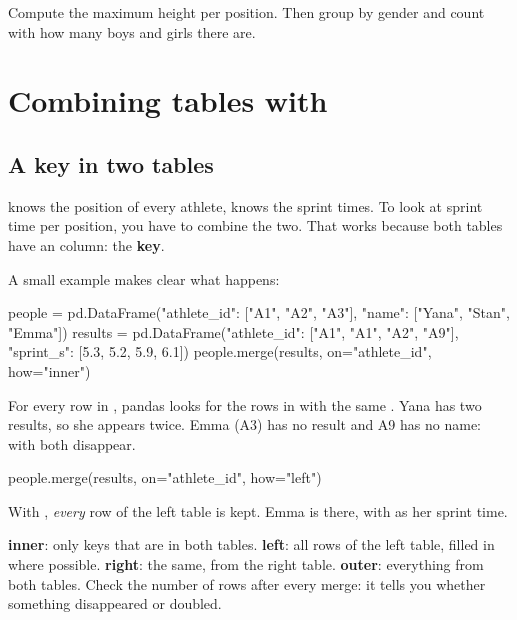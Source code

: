 \documentclass[11pt,a4paper]{article}
\begin{document}
\begin{tryit}
Compute the maximum height per position. Then group by gender and count
with  how many boys and girls there are.
\end{tryit}

\section{Combining tables with }\label{sec:merge}

\subsection{A key in two tables}

 knows the position of every athlete,  knows
the sprint times. To look at sprint time per position, you have to
combine the two. That works because both tables have an
 column: the \textbf{key}.

A small example makes clear what happens:

\begin{python}
people = pd.DataFrame({"athlete_id": ["A1", "A2", "A3"],
                       "name": ["Yana", "Stan", "Emma"]})
results = pd.DataFrame({"athlete_id": ["A1", "A1", "A2", "A9"],
                        "sprint_s": [5.3, 5.2, 5.9, 6.1]})
people.merge(results, on="athlete_id", how="inner")
\end{python}

For every row in , pandas looks for the rows in
 with the same . Yana has two results,
so she appears twice. Emma (A3) has no result and A9 has no name: with
 both disappear.

\begin{python}
people.merge(results, on="athlete_id", how="left")
\end{python}

With , \emph{every} row of the left table is kept. Emma
is there, with  as her sprint time.

\begin{keyidea}
\textbf{inner}: only keys that are in both tables.
\textbf{left}: all rows of the left table, filled in where possible.
\textbf{right}: the same, from the right table.
\textbf{outer}: everything from both tables.
Check the number of rows after every merge: it tells you whether
something disappeared or doubled.
\end{keyidea}
\end{document}
